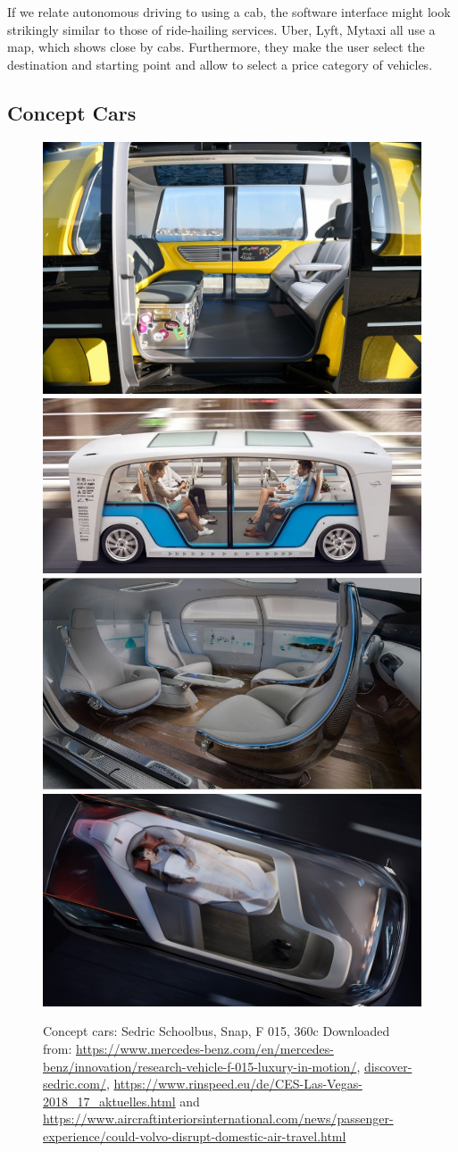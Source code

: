 If we relate autonomous driving to using a cab, the software interface might look strikingly similar to those of ride-hailing services. Uber, Lyft, Mytaxi all use a map, which shows close by cabs. Furthermore, they make the user select the destination and starting point and allow to select a price category of vehicles.  

\subsection{Concept Cars}
\label{sec:conceptcars}
\begin{figure}
    \includegraphics[height=0.27\textwidth]{fig/school_bus_Mittel.jpg}\hfill\includegraphics[height=0.27\textwidth]{fig/snap.jpg}\newline\includegraphics[height=0.276\textwidth]{fig/mercedes.JPG}\hfill\includegraphics[height=0.276\textwidth]{fig/360c_Mittel.jpg}
    \caption[Concept Cars]{Concept cars: Sedric Schoolbus, Snap, F 015, 360c Downloaded from: \url{https://www.mercedes-benz.com/en/mercedes-benz/innovation/research-vehicle-f-015-luxury-in-motion/}, \url{discover-sedric.com/}, \url{https://www.rinspeed.eu/de/CES-Las-Vegas-2018_17_aktuelles.html} and \url{https://www.aircraftinteriorsinternational.com/news/passenger-experience/could-volvo-disrupt-domestic-air-travel.html}}
    \label{fig:conceptcars}
\end{figure}
